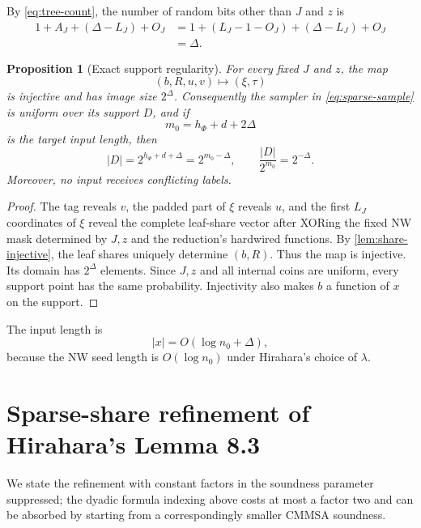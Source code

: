 \documentclass[11pt]{article}
\newtheorem{proposition}[theorem]{Proposition}
\theoremstyle{definition}
\begin{document}
By \cref{eq:tree-count}, the number of random bits other than $J$ and $z$ is
\begin{align*}
 1+A_J+(\Delta-L_J)+O_J
 &=1+(L_J-1-O_J)+(\Delta-L_J)+O_J\\
 &=\Delta.
\end{align*}

\begin{proposition}[Exact support regularity]\label{prop:regularity}
For every fixed $J$ and $z$, the map
\[
 (b,R,u,v)\longmapsto(\xi,\tau)
\]
is injective and has image size $2^\Delta$.  Consequently the sampler in \eqref{eq:sparse-sample} is uniform over its support $D$, and if
\[
 m_0=h_\Phi+d+2\Delta
\]
is the target input length, then
\begin{equation}\label{eq:density}
 |D|=2^{h_\Phi+d+\Delta}=2^{m_0-\Delta},
 \qquad
 \frac{|D|}{2^{m_0}}=2^{-\Delta}.
\end{equation}
Moreover, no input receives conflicting labels.
\end{proposition}

\begin{proof}
The tag reveals $v$, the padded part of $\xi$ reveals $u$, and the first $L_J$ coordinates of $\xi$ reveal the complete leaf-share vector after XORing the fixed NW mask determined by $J,z$ and the reduction's hardwired functions.  By \cref{lem:share-injective}, the leaf shares uniquely determine $(b,R)$.  Thus the map is injective.  Its domain has $2^\Delta$ elements.  Since $J,z$ and all internal coins are uniform, every support point has the same probability.  Injectivity also makes $b$ a function of $x$ on the support.
\end{proof}

The input length is
\[
 |x|=O(\log n_0+\Delta),
\]
because the NW seed length is $O(\log n_0)$ under Hirahara's choice of $\lambda$.

\section{Sparse-share refinement of Hirahara's Lemma 8.3}

We state the refinement with constant factors in the soundness parameter suppressed; the dyadic formula indexing above costs at most a factor two and can be absorbed by starting from a correspondingly smaller CMMSA soundness.
\end{document}

